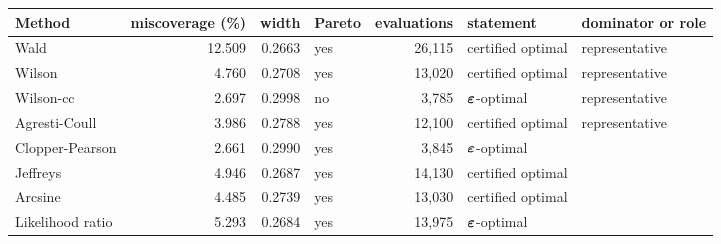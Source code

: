 \begin{tabular}{lrrlrll}
\toprule
Method & miscoverage (\%) & width & Pareto & evaluations & statement & dominator or role \\
\midrule
Wald & 12.509 & 0.2663 & yes & 26,115 & certified optimal & representative \\
Wilson & 4.760 & 0.2708 & yes & 13,020 & certified optimal & representative \\
Wilson-cc & 2.697 & 0.2998 & no & 3,785 & $\bm{\varepsilon}$-optimal & representative \\
Agresti-Coull & 3.986 & 0.2788 & yes & 12,100 & certified optimal & representative \\
Clopper-Pearson & 2.661 & 0.2990 & yes & 3,845 & $\bm{\varepsilon}$-optimal &  \\
Jeffreys & 4.946 & 0.2687 & yes & 14,130 & certified optimal &  \\
Arcsine & 4.485 & 0.2739 & yes & 13,030 & certified optimal &  \\
Likelihood ratio & 5.293 & 0.2684 & yes & 13,975 & $\bm{\varepsilon}$-optimal &  \\
\bottomrule
\end{tabular}
